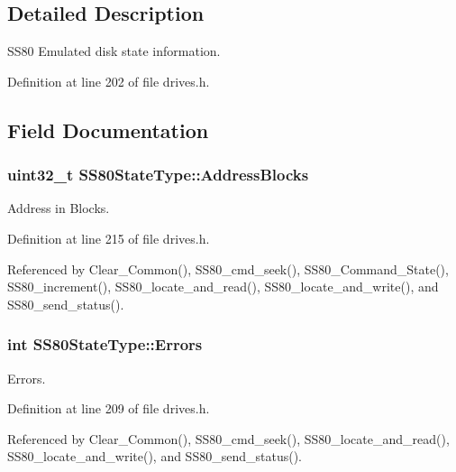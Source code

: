\subsection{Detailed Description}
S\+S80 Emulated disk state information. 

Definition at line 202 of file drives.\+h.



\subsection{Field Documentation}
\subsubsection[{\texorpdfstring{Address\+Blocks}{AddressBlocks}}]{\setlength{\rightskip}{0pt plus 5cm}uint32\+\_\+t S\+S80\+State\+Type\+::\+Address\+Blocks}\hypertarget{structSS80StateType_a6cffa1e36a57bce4188ede4bd9dbd7ad}{}\label{structSS80StateType_a6cffa1e36a57bce4188ede4bd9dbd7ad}


Address in Blocks. 



Definition at line 215 of file drives.\+h.



Referenced by Clear\+\_\+\+Common(), S\+S80\+\_\+cmd\+\_\+seek(), S\+S80\+\_\+\+Command\+\_\+\+State(), S\+S80\+\_\+increment(), S\+S80\+\_\+locate\+\_\+and\+\_\+read(), S\+S80\+\_\+locate\+\_\+and\+\_\+write(), and S\+S80\+\_\+send\+\_\+status().

\subsubsection[{\texorpdfstring{Errors}{Errors}}]{\setlength{\rightskip}{0pt plus 5cm}int S\+S80\+State\+Type\+::\+Errors}\hypertarget{structSS80StateType_a7a5c363c6f617ee457a4daacadb3a7b2}{}\label{structSS80StateType_a7a5c363c6f617ee457a4daacadb3a7b2}


Errors. 



Definition at line 209 of file drives.\+h.



Referenced by Clear\+\_\+\+Common(), S\+S80\+\_\+cmd\+\_\+seek(), S\+S80\+\_\+locate\+\_\+and\+\_\+read(), S\+S80\+\_\+locate\+\_\+and\+\_\+write(), and S\+S80\+\_\+send\+\_\+status().

